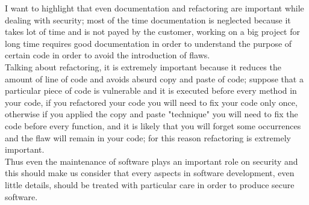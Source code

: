 I want to highlight that even documentation and refactoring are important while dealing with security; most of the time documentation is neglected because it takes lot of time and is not payed by the customer, working on a big project for long time
requires good documentation in order to understand the purpose of certain code in order to avoid the introduction of flaws.\\
Talking about refactoring, it is extremely important because it reduces the amount of line of code and
avoids absurd copy and paste of code; suppose that a particular piece of code is vulnerable and it is executed
before every method in your code, if you refactored your code you will need to fix your code only once, otherwise
if you applied the copy and paste "technique" you will need to fix the code before every function, and it is likely that you will forget some occurrences and the flaw will remain in your code; for this reason refactoring is extremely important.\\
Thus even the maintenance of software plays an important role on security and this should make us consider that every
aspects in software development, even little details, should be treated with particular care in order to produce secure software.